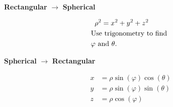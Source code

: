 \documentclass[mathNotesPreamble]{subfiles}
\begin{document}
  \begin{thmBox*}
    \vspace*{0.5\baselineskip}
    \begin{minipage}{0.5\linewidth}
      \begin{center}
        \textbf{Rectangular} $\rightarrow$ \textbf{Spherical}
      \end{center}
      \begin{align*}
        \rho^2&=x^2+y^2+z^2\\
        &\hspace*{-15pt}\textnormal{Use trigonometry to find}\\
        &\hspace*{-15pt}\varphi \textnormal{ and } \theta.
      \end{align*}
    \end{minipage}%
    \begin{minipage}{0.5\linewidth}
      \begin{center}
        \textbf{Spherical} $\rightarrow$ \textbf{Rectangular}
      \end{center}
      \begin{align*}
        x&=\rho\sin(\varphi)\cos(\theta)\\
        y&=\rho\sin(\varphi)\sin(\theta)\\
        z&=\rho\cos(\varphi)
      \end{align*}
    \end{minipage}%
  \end{thmBox*}
\end{document}
